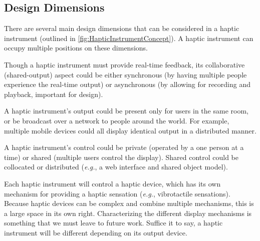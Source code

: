 \subsection{Design Dimensions}
There are several main design dimensions that can be considered in a haptic instrument (outlined in \autoref{fig:HapticInstrumentConcept}).
A haptic instrument can occupy multiple positions on these dimensions.


Though a haptic instrument must provide real-time feedback, its collaborative (shared-output) aspect could be either synchronous (by having multiple people experience the real-time output) or asynchronous (by allowing for recording and playback, important for design).

	 A haptic instrument's output could be present only for users in the same room, or be broadcast over a network to people around the world. For example, multiple mobile devices could all display identical output in a distributed manner.

	 A haptic instrument's control %
 could be private (operated by a one person at a time) or shared (multiple users control the display). 
Shared control could be collocated or distributed (\emph{e.g.}, a web interface and shared object model).
	
	 Each haptic instrument will control a haptic device, which has its own mechanism for providing a haptic sensation (\emph{e.g.}, vibrotactile sensations). Because haptic devices can be complex and combine multiple mechanisms, this is a large space in its own right. Characterizing the different display mechanisms is something that we must leave to future work. Suffice it to say, a haptic instrument will be different depending on its output device.

